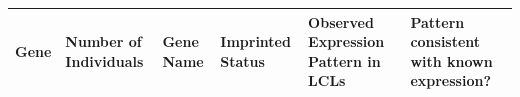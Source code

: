 \begin{table}
	\ContinuedFloat
\centering
\begin{adjustbox}{width={\textwidth}}
\begin{tabular}{@{}p{4cm}p{3cm}p{3cm}p{3cm}p{3cm}p{3cm}@{}}
\toprule Gene & 	Number of \newline Individuals & 	Gene Name&	Imprinted \newline Status	&Observed \newline Expression \newline Pattern \newline in LCLs	&Pattern \newline consistent with \newline known \newline expression? \\ \midrule


\end{tabular}
\end{adjustbox}
\end{table}
